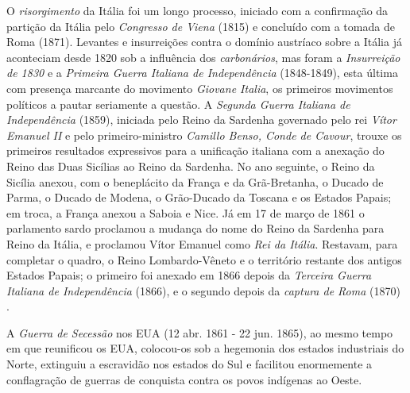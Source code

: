 O \textit{risorgimento} da Itália foi um longo processo, iniciado com a confirmação da partição da Itália pelo \textit{Congresso de Viena} (1815) e concluído com a tomada de Roma (1871). Levantes e insurreições contra o domínio austríaco sobre a Itália já aconteciam desde 1820 sob a influência dos \textit{carbonários}, mas foram a \textit{Insurreição de 1830} e a \textit{Primeira Guerra Italiana de Independência} (1848-1849), esta última com presença marcante do movimento \textit{Giovane Italia}, os primeiros movimentos políticos a pautar seriamente a questão. A \textit{Segunda Guerra Italiana de Independência} (1859), iniciada pelo Reino da Sardenha governado pelo rei \textit{Vítor Emanuel II} e pelo primeiro-ministro \textit{Camillo Benso, Conde de Cavour}, trouxe os primeiros resultados expressivos para a unificação italiana com a anexação do Reino das Duas Sicílias ao Reino da Sardenha. No ano seguinte, o Reino da Sicília anexou, com o beneplácito da França e da Grã-Bretanha, o Ducado de Parma, o Ducado de Modena, o Grão-Ducado da Toscana e os Estados Papais; em troca, a França anexou a Saboia e Nice. Já em 17 de março de 1861 o parlamento sardo proclamou a mudança do nome do Reino da Sardenha para Reino da Itália, e proclamou Vítor Emanuel como \textit{Rei da Itália}. Restavam, para completar o quadro, o Reino Lombardo-Vêneto e o território restante dos antigos Estados Papais; o primeiro foi anexado em 1866 depois da \textit{Terceira Guerra Italiana de Independência} (1866), e o segundo depois da \textit{captura de Roma} (1870) \cite{hobsbawm_capital_1977}.

A \textit{Guerra de Secessão} nos EUA (12 abr. 1861 - 22 jun. 1865), ao mesmo tempo em que reunificou os EUA, colocou-os sob a hegemonia dos estados industriais do Norte, extinguiu a escravidão nos estados do Sul e facilitou enormemente a conflagração de guerras de conquista contra os povos indígenas ao Oeste. 

